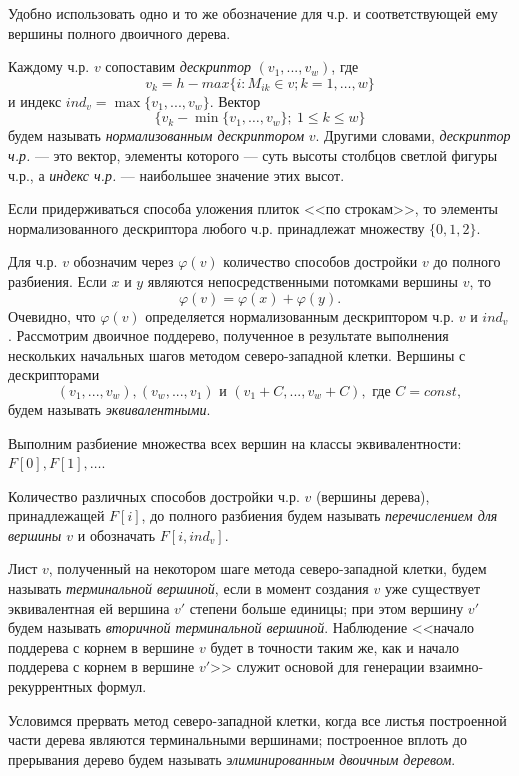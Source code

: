 \begin{remark} Удобно использовать одно и то же обозначение для ч.р. и соответствующей ему вершины полного двоичного дерева.
\end{remark}
Каждому ч.р. $v$ сопоставим \textit{ дескриптор} $(v_1,...,v_w)$, где
$$
v_k  = h-max\{i: M_{ik}\in v; k=1,\dots, w\}
$$
и индекс $ind_v= \max\{v_1,...,v_w\}$. Вектор
$$\{v_k-\min\{v_1,\dots,v_w\};\ 1\leq k\leq w\}$$
будем называть \textit{ нормализованным дескриптором} $v$. Другими словами, \textit{ дескриптор ч.р.} --- это вектор, элементы которого --- суть высоты столбцов светлой фигуры ч.р., а \textit{ индекс ч.р.} --- наибольшее значение этих высот.
\begin {remark} Если придерживаться способа уложения плиток <<по строкам>>, то элементы нормализованного дескриптора любого ч.р. принадлежат множеству $\{0, 1, 2\}$.
\end{remark}
Для ч.р. $v$ обозначим через $\varphi(v)$ количество способов достройки $v$ до полного разбиения. Если $x$ и $y$ являются непосредственными потомками вершины $v$, то
\begin{equation}\label{eq03}
\varphi(v)=\varphi(x)+\varphi(y).
\end{equation}
Очевидно, что $\varphi(v)$ определяется нормализованным дескриптором ч.р. $v$ и $ind_v$.
Рассмотрим двоичное поддерево, полученное в результате выполнения нескольких начальных шагов методом северо-западной клетки. Вершины с дескрипторами
$$
(v_1,...,v_w), (v_w,...,v_1) \text{ и }  (v_1  + C,...,v_w  + C),
\text{ где } C = const,
$$
будем называть \textit{ эквивалентными}.

Выполним разбиение множества всех вершин на классы эквивалентности: $F[0], F[1], \dots$.

Количество различных способов достройки ч.р. $v$ (вершины дерева), принадлежащей $F[i]$, до полного разбиения будем называть \textit{ перечислением для вершины $v$} и обозначать $F[i,ind_v]$.

Лист $v$, полученный на некотором шаге метода северо-западной клетки, будем называть \textit{ терминальной вершиной}, если в момент создания $v$ уже существует эквивалентная ей вершина $v'$ степени больше единицы; при этом вершину $v'$ будем называть \textit{ вторичной терминальной вершиной}.  Наблюдение <<начало поддерева с корнем в вершине $v$ будет в точности таким же, как и начало поддерева с корнем в вершине $v'$>> служит основой для генерации взаимно-рекуррентных формул.

Условимся прервать метод северо-западной клетки, когда все листья построенной части дерева являются терминальными вершинами; построенное вплоть до прерывания дерево будем называть \textit{ элиминированным двоичным деревом}.

